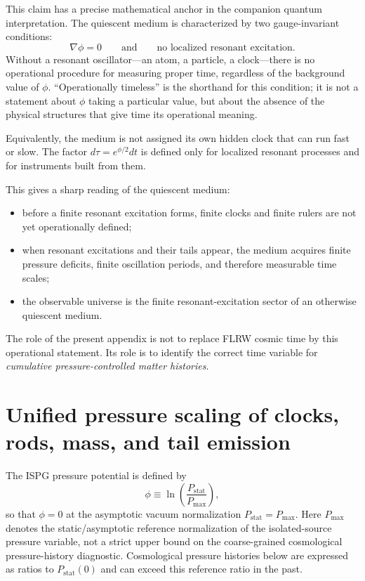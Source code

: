\documentclass[11pt]{article}
\begin{document}
This claim has a precise mathematical anchor in the companion quantum
interpretation.  The quiescent medium is characterized by two
gauge-invariant conditions:
\begin{equation}
  \nabla\phi = 0
  \qquad\text{and}\qquad
  \text{no localized resonant excitation.}
  \label{eq:quiescent_def}
\end{equation}
Without a resonant oscillator---an atom, a particle, a clock---there is no
operational procedure for measuring proper time, regardless of the
background value of $\phi$.  ``Operationally timeless'' is the shorthand
for this condition; it is not a statement about $\phi$ taking a particular
value, but about the absence of the physical structures that give time its
operational meaning.

Equivalently, the medium is not assigned its own hidden clock that can run
fast or slow.  The factor $d\tau=e^{\phi/2}dt$ is defined only for
localized resonant processes and for instruments built from them.

This gives a sharp reading of the quiescent medium:
\begin{itemize}
\item before a finite resonant excitation forms, finite clocks and finite
  rulers are not yet operationally defined;
\item when resonant excitations and their tails appear, the medium acquires
  finite pressure deficits, finite oscillation periods, and therefore
  measurable time scales;
\item the observable universe is the finite resonant-excitation sector of an
  otherwise quiescent medium.
\end{itemize}

The role of the present appendix is not to replace FLRW cosmic time by this
operational statement.  Its role is to identify the correct time variable
for \emph{cumulative pressure-controlled matter histories}.

\section{Unified pressure scaling of clocks, rods, mass, and tail emission}
\label{sec:clocklaw_app18}

The ISPG pressure potential is defined by
\begin{equation}
  \phi \equiv \ln\!\left(\frac{P_{\mathrm{stat}}}{P_{\max}}\right),
\end{equation}
so that $\phi=0$ at the asymptotic vacuum normalization
$P_{\mathrm{stat}}=P_{\max}$.
Here $P_{\max}$ denotes the static/asymptotic reference
normalization of the isolated-source pressure variable,
not a strict upper bound on the coarse-grained cosmological
pressure-history diagnostic.  Cosmological pressure histories
below are expressed as ratios to $P_{\mathrm{stat}}(0)$ and
can exceed this reference ratio in the past.
\end{document}
